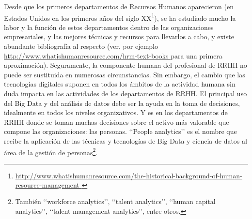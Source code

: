 Desde que los primeros departamentos de Recursos Humanos aparecieron (en Estados Unidos
en los primeros años del siglo XX\footnote{\url{http://www.whatishumanresource.com/the-historical-background-of-human-resource-management }}),
se ha estudiado mucho la labor y la función de estos departamentos dentro de las organizaciones
empresariales, y las mejores técnicas y recursos para llevarlos a cabo, y existe abundante bibliografía
al respecto (ver, por ejemplo \url{http://www.whatishumanresource.com/hrm-text-books } para una
primera aproximación). Seguramente, la componente humana del profesional de RRHH no puede ser sustituida
en numerosas circunstancias. Sin embargo, el cambio que las tecnologías digitales
suponen en todos los ámbitos de la actividad humana sin duda impacta en las
actividades de los departamentos de RRHH. El principal uso del Big Data y del análisis
de datos debe ser la ayuda en la toma de decisiones, idealmente en todos los niveles
organizativos. Y es en los departamentos de RRHH donde se toman muchas decisiones sobre el
activo más valorable que compone las organizaciones: las personas. \lq\lq People analytics\rq\rq
es el nombre que recibe la aplicación de las técnicas y tecnologías de Big Data y ciencia de
datos al área de la gestión de personas\footnote{También  \lq\lq workforce analytics\rq\rq, 
\lq\lq talent analytics\rq\rq, \lq\lq human capital analytics\rq\rq, 
\lq\lq talent management analytics\rq\rq, entre otros.}. 

